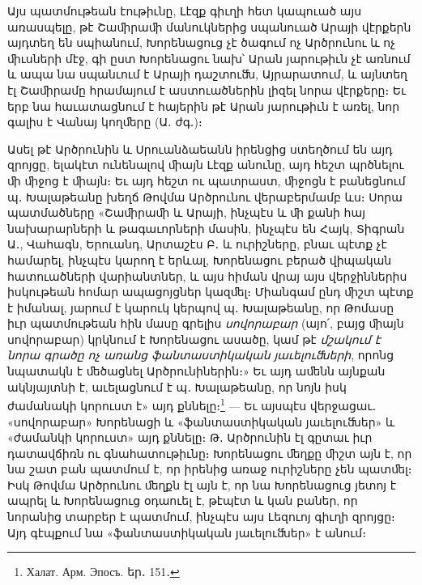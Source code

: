 \documentclass{article}
\begin{document}
{Այս պատմութեան էութիւնը, Լէզք գիւղի հետ կապուած այս առասպելը, թէ Շաﬕրաﬕ մանուկներից սպանուած Արայի վէրքերն այդտեղ են սպիանում, Խորենացուց չէ ծագում ոչ Արծրունու և ոչ ﬕւսների մէջ, գի ըստ Խորենացու նախ՝ Արան յարութիւն չէ առնում և ապա նա սպանւում է Արայի դաշտուﬓ, Այրարատում, և այնտեղ էլ Շաﬕրամը հրամայում է աստուածներին լիզել նորա վէրքերը։ Եւ երբ նա հաւատացնում է հայերին թէ Արան յարութիւն է առել, նոր գալիս է Վանայ կողﬔրը (Ա․ ժգ․)։

Ասել թէ Արծրունին և Սրուանձաեանն իրենցից ստեղծում են այդ զրոյցը, ելակէտ ունենալով ﬕայն Լէզք անունը, այդ հեշտ պրծնելու ﬕ ﬕջոց է ﬕայն։ Եւ այդ հեշտ ու պատրաստ, ﬕջոցն է բանեցնում պ․ Խալաթեանը խեղճ Թովմա Արծրունու վերաբերմամբ ևս։ Սորա պատմածները «Շաﬕրաﬕ և Արայի, ինչպէս և ﬕ քանի հայ նախարարների և թագաւորների մասին, ինչպէս են Հայկ, Տիգրան Ա․, Վահագն, Երուանդ, Արտաշէս Բ․ և ուրիշները, բնաւ պէտք չէ համարել, ինչպէս կարող է երևալ, Խորենացու բերած վիպական հատուածների վարիանտներ, և այս հիման վրայ այս վերջիններիս իսկութեան հոմար ապացոյցներ կազﬔլ։ Միանգամ ընդ ﬕշտ պէտք է իմանալ, յարում է կարուկ կերպով պ․ Խալաթեանը, որ Թոմասը իւր պատմութեան հին մասը գրելիս \emph{սովորաբար} (այո՛, բայց ﬕայն սովորաբար) կրկնում է Խորենացու ասածը, կամ թէ \emph{մշակում է նորա գրածը ոչ առանց ֆանտաստիկական յաւելուﬓերի}, որոնց նպատակն է ﬔծացնել Արծրունիներին։» Եւ այդ աﬔնն այնքան ակնյայտնի է, աւելացնում է պ․ Խալաթեանը, որ նոյն իսկ ժամանակի կորուստ է» այդ քննելը։\footnote{Халат. Арм. Эпосъ. եր․ 151․} — Եւ այսպէս վերջացաւ․ «սովորաբար» Խորենացի և «ֆանտաստիկական յաւելուﬓեր» և «ժամանկի կորուստ» այդ քննելը։ Թ․ Արծրունին էլ գըտաւ իւր դատավճիռն ու գնահատութիւնը։ Խորենացու ﬔղքը ﬕշտ այն է, որ նա շատ բան պատմում է, որ իրենից առաջ ուրիշները չեն պատﬔլ։ Իսկ Թովմա Արծրունու ﬔղքն էլ այն է, որ նա Խորենացուց յետոյ է ապրել և Խորենացուց օդաուել է, թէպէտ և կան բաներ, որ նորանից տարբեր է պատմում, ինչպէս այս Լեզուոյ գիւղի զրոյցը։ Այդ գէպքում նա «ֆանտաստիկական յաւելուﬓեր» է անում։

}
\end{document}
